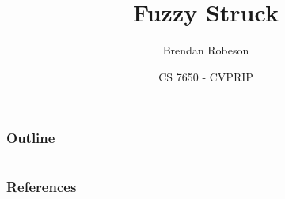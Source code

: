 \documentclass[mathserif]{beamer}
\title{Fuzzy Struck}
\author{Brendan Robeson}
\date[CS 7650]{CS 7650 - CVPRIP}
\institute{Utah State University}
\begin{document}
\begin{frame}
    \titlepage
\end{frame}

\begin{frame}
    \frametitle{Outline}
    \tableofcontents
\end{frame}






%

\section{}
\begin{frame}[allowframebreaks]
    \frametitle{References}
    
    
\end{frame}
\end{document}
